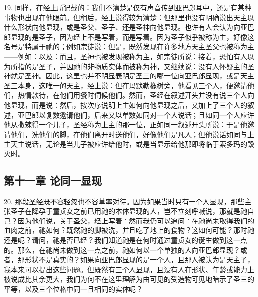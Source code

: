 19. 同样，在经上所记载的：我们不清楚是仅有声音传到亚巴郎耳中，还是有某种事物也出现在他眼前。但稍后，经上说得较为清楚：但那里也没有明确说出天主以什么形状向他显现，或是圣父、圣子、还是圣神向他显现。也许有人会认为向亚巴郎显现的是圣子，因为经上不是写着，而是写着。因为圣子似乎被称为主，好像这名号是特属于祂的；例如宗徒说：但是，既然发现在许多地方天主圣父也被称为主——例如：以及：而且，圣神也被发现被称为主，如宗徒所说：接着，恐怕有人以为所指的是圣子，并因祂的非物质实体而被称为神，又继续说：没有人怀疑主的圣神就是圣神。因此，这里也并不明显表明是圣三的哪一位向亚巴郎显现，或是天主圣三本身，这唯一的天主，经上说：但在玛默勒橡树旁，他看见三个人，便邀请他们，热情款待，在他们用餐时伺候他们。然而，圣经在叙述开头并没有说三个人向他显现，而是说：然后，按次序说明上主如何向他显现之后，又加上了三个人的叙述，亚巴郎以复数邀请他们，后来又以单数如同对一个人说话；且如同一个人应许他从撒辣得一个儿子，圣经称为上主的那一位，正如同一叙述开头所说：于是他邀请他们，洗他们的脚，在他们离开时送他们，好像他们是凡人；但他说话如同与上主天主说话，无论是当儿子被应许给他时，或是当显示给他那即将临于索多玛的毁灭时。\par


\subsection{第十一章 论同一显现}

20. 那段圣经既不容轻忽也不容草率对待。因为如果当时只有一个人显现，那些主张圣子在降孕于童贞女之前已用祂的本体显现的人，岂不立刻呼喊说，那就是祂自己？因为他们说，关于圣父，经上写着：然而我仍可以追问：在祂尚未取得我们的血肉之前，祂如何？既然祂的脚被洗，并且吃了地上的食物？这如何可能？那时祂还是呢？请问，祂是否已经？我们知道祂是在何时通过童贞女的诞生做到这一点的。那么，在祂尚未做到这一点之前，祂如何以一个单独的人向亚巴郎显现？或者，那形状不是真实的？如果向亚巴郎显现的是一个人，且那人被认为是天主子，我本来可以提出这些问题。但既然有三个人显现，且没有人在形状、年龄或能力上被说成比其余更大，我们为何不在这里理解为由可见的受造物可见地暗示了圣三的平等，以及三个位格中同一且相同的实体呢？\par

